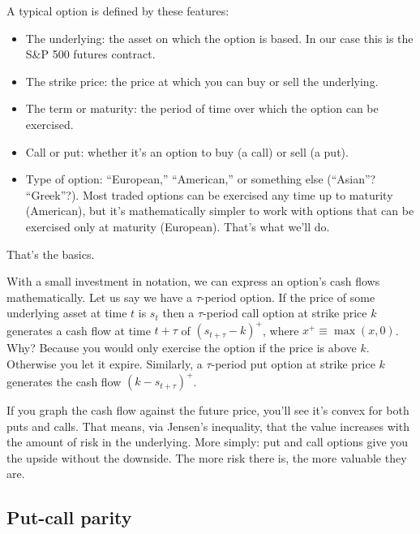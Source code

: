 \documentclass[11pt]{article}
\begin{document}
A typical option is defined by these features:
\begin{itemize}
\item The underlying:  the asset on which the option is based.
In our case this is the S\&P 500 futures contract.
\item The strike price: the price at which you can buy or sell
the underlying.
\item The term or maturity: the period of time
over which the option can be exercised.
\item Call or put:  whether it's an option to buy (a call) or sell (a put).
\item Type of option:  ``European,'' ``American,'' or something else (``Asian''?  ``Greek''?).
Most traded options can be exercised any time up to maturity (American),
but it's mathematically simpler to work with options that can be
exercised only at maturity (European).
That's what we'll do.
\end{itemize}
That's the basics.

With a small investment in notation,
we can express an option's cash flows mathematically.
Let us say we have a $\tau$-period option.
If the price of some underlying asset at time $t$ is $s_t$
then a $\tau$-period call option at strike price $k$
generates a cash flow at time $t+\tau$ of
$ ( s_{t+\tau} - k )^+ $,
where $x^+ \equiv \max(x,0) $.
Why?  Because you would only exercise the option if the price is above $k$.
Otherwise you let it expire.
Similarly, a $\tau$-period put option at strike price $k$
generates the cash flow $ (k - s_{t+\tau} )^+ $.

If you graph the cash flow against the future price, you'll see
it's convex for both puts and calls.
That means, via Jensen's inequality, that the value increases with the amount
of risk in the underlying.
More simply:  put and call options give you the upside
without the downside.
The more risk there is, the more valuable they are.


\subsection*{Put-call parity}
\end{document}
